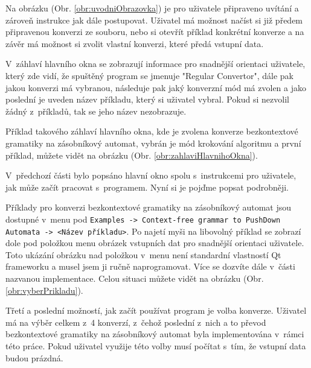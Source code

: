 
Na obrázku (Obr. \ref{obr:uvodniObrazovka}) je pro uživatele připraveno uvítání a zároveň instrukce jak dále postupovat. Uživatel má možnost načíst si již předem připravenou konverzi ze souboru, nebo si otevřít příklad konkrétní konverze a na závěr má možnost si zvolit vlastní konverzi, které předá vstupní data.



V~záhlaví hlavního okna se zobrazují informace pro snadnější orientaci uživatele, který zde vidí, že spuštěný program se jmenuje "Regular Convertor", dále pak jakou konverzi má vybranou, následuje pak jaký konverzní mód má zvolen a jako poslední je uveden název příkladu, který si uživatel vybral. Pokud si nezvolil žádný z~příkladů, tak se jeho název nezobrazuje.

Příklad takového záhlaví hlavního okna, kde je zvolena konverze bezkontextové gramatiky na zásobníkový automat, vybrán je mód krokování algoritmu a první příklad, můžete vidět na obrázku (Obr. \ref{obr:zahlaviHlavnihoOkna}).



V~předchozí části bylo popsáno hlavní okno spolu s~instrukcemi pro uživatele, jak může začít pracovat s~programem. Nyní si je pojďme popsat podrobněji.


Příklady pro konverzi bezkontextové gramatiky na zásobníkový automat jsou dostupné v~menu pod \texttt{Examples -> Context-free grammar to PushDown Automata -> <Název příkladu>}. Po najetí myši na libovolný příklad se zobrazí dole pod položkou menu obrázek vstupních dat pro snadnější orientaci uživatele. Toto ukázání obrázku nad položkou v~menu není standardní vlastností Qt frameworku a musel jsem ji ručně naprogramovat. Více se dozvíte dále v~části nazvanou implementace. Celou situaci můžete vidět na obrázku (Obr. \ref{obr:vyberPrikladu}).



Třetí a poslední možností, jak začít používat program je volba konverze. Uživatel má na výběr celkem z~4 konverzí, z~čehož poslední z~nich a to převod bezkontextové gramatiky na zásobníkový automat byla implementována v~rámci této práce. Pokud uživatel využije této volby musí počítat s~tím, že vstupní data budou prázdná.

